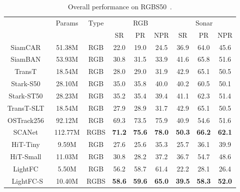 \begin{table}[t]

\centering
\footnotesize
\renewcommand{\arraystretch}{1.05}
\setlength{\tabcolsep}{2.1pt}
\begin{tabular}{c|c|c|ccc|ccc}
\hline
\multirow{2}{*}{} & \multirow{2}{*}{Params} & \multirow{2}{*}{Type} & \multicolumn{3}{c|}{RGB} & \multicolumn{3}{c}{Sonar} \\ \cline{4-9} 
                  &                         &                       & SR     & PR     & NPR    & SR      & PR     & NPR    \\ \hline
SiamCAR~\cite{siamcar}       & 51.38M      & RGB                   & 22.0   & 19.0   & 24.5   & 36.9    & 64.0     & 45.6   \\
SiamBAN~\cite{siamban}       & 53.93M      & RGB                   & 30.8   & 31.5   & 33.9   & 41.6    & 65.8   & 51.6   \\
TransT~\cite{transt}         & 18.54M      & RGB                   & 28.0   & 29.0   & 31.9   & 42.9    & 65.1   & 50.5   \\
Stark-S50~\cite{stark}      & 28.10M      & RGB                   & 35.0   & 35.8   & 40.0   & 40.2    & 60.5   & 50.1   \\
Stark-ST50~\cite{stark}     & 28.23M      & RGB                   & 35.2   & 35.4   & 39.4   & 41.1    & 62.3   & 51.4   \\
TransT-SLT~\cite{transtslt}  & 18.54M      & RGB                   & 27.9   & 28.9   & 31.7   & 42.9    & 65.1   & 50.5   \\
OSTrack256~\cite{ostrack}    & 92.12M      & RGB                   & 69.3   & 73.5   & 75.9   & 40.9    & 54.6   & 51.6   \\
SCANet~\cite{rgbs50}         & 112.77M     & RGBS                  & \color{red}\textbf{71.2}   & \color{red}\textbf{75.6}   & \color{red}\textbf{78.0}   & \color{red}\textbf{50.3}    & \color{red}\textbf{66.2}   & \color{red}\textbf{62.1}   \\ \hline
HiT-Tiny~\cite{hit}          & 9.59M                & RGB                   & 27.6   & 25.6   & 35.3   & 25.7    & 36.1   & 39.9   \\
HiT-Small~\cite{hit}         & 11.03M               & RGB                   & 30.8   & 28.2   & 37.2   & 36.7    & 54.7   & 48.6   \\
LightFC~\cite{lightfc}       & 5.50M             & RGB                   & 56.2   & 58.7   & 61.4   & 22.2    & 28.1   & 26.4   \\ \hline
LightFC-S                    & 10.40M                 & RGBS                  & \color{blue}\textbf{58.6}   & \color{blue}\textbf{59.6}   & \color{blue}\textbf{65.0}   & \color{blue}\textbf{39.5}    & \color{blue}\textbf{58.3}   & \color{blue}\textbf{52.0}   \\ \hline
\end{tabular}
\caption{Overall performance on RGBS50~\cite{rgbs50}. 
}
\label{table rgbs}
\end{table}